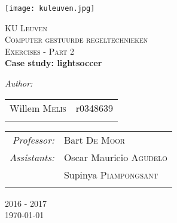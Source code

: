 \begin{titlepage}
\begin{center}

\texttt{[image: kuleuven.jpg]}~\\[1cm]
\vfill


\textsc{\LARGE KU Leuven}\\[0.7cm]

\textsc{\Large Computer gestuurde regeltechnieken}\\[0.7cm]
\textsc{\Large Exercises - Part 2 }\\[0.7cm]



\centering \huge \bfseries Case study: lightsoccer

\end{center}

\vfill

\begin{center}
\emph{Author:} \\[.2cm]
\begin{tabular}[h]{rl}
Willem \textsc{Melis} & r0348639\\
\phantom{------------------------} & \phantom{------------------------}\\
\end{tabular}
\end{center}

\vfill

\begin{center}
\begin{tabular}[h]{rl}
\emph{Professor:} & Bart \textsc{De Moor} \\
\emph{Assistants:}&  
Oscar Mauricio  \textsc{Agudelo} \\
&  Supinya  \textsc{Piampongsant} \\
\phantom{------------------------} & \phantom{------------------------}\\
\end{tabular}
\end{center}

\vfill
\vfill
\vfill

\begin{center} 
2016 - 2017 \\[.5cm]
{\Large \today}
\end{center}

\end{titlepage}